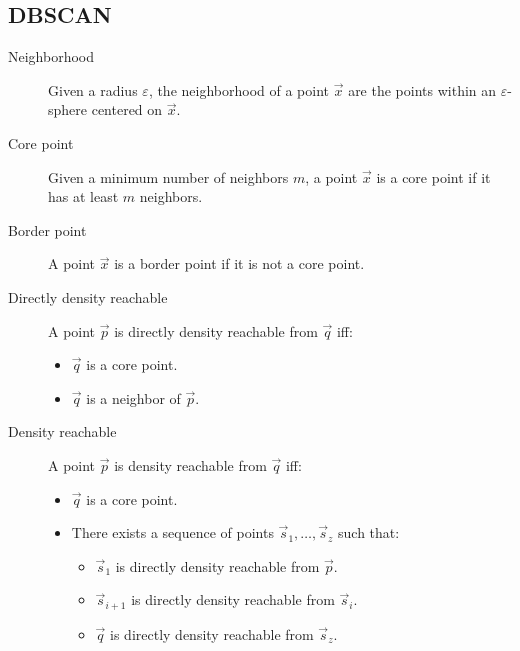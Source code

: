 \subsection{DBSCAN}

\begin{description}
    \item[Neighborhood] 
        Given a radius $\varepsilon$, the neighborhood of a point $\vec{x}$ are the points within an $\varepsilon$-sphere centered on $\vec{x}$.

    \item[Core point] 
        Given a minimum number of neighbors $m$, 
        a point $\vec{x}$ is a core point if it has at least $m$ neighbors.

    \item[Border point] 
        A point $\vec{x}$ is a border point if it is not a core point.

    \item[Directly density reachable] 
        A point $\vec{p}$ is directly density reachable from $\vec{q}$ iff:
        \begin{itemize}
            \item $\vec{q}$ is a core point.
            \item $\vec{q}$ is a neighbor of $\vec{p}$.
        \end{itemize}

    \item[Density reachable] 
        A point $\vec{p}$ is density reachable from $\vec{q}$ iff:
        \begin{itemize}
            \item $\vec{q}$ is a core point.
            \item There exists a sequence of points $\vec{s}_1, \dots, \vec{s}_z$ such that:
            \begin{itemize}
                \item $\vec{s}_1$ is directly density reachable from $\vec{p}$.
                \item $\vec{s}_{i+1}$ is directly density reachable from $\vec{s}_i$.
                \item $\vec{q}$ is directly density reachable from $\vec{s}_z$.
            \end{itemize}
        \end{itemize}


\end{description}
